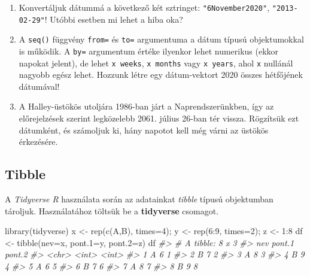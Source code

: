 \documentclass[
]{book}
\makeatletter
\newenvironment{Shaded}{\begin{snugshade}}{\end{snugshade}}
\newcommand{\AttributeTok}[1]{\textcolor[rgb]{0.77,0.63,0.00}{#1}}
\newcommand{\CommentTok}[1]{\textcolor[rgb]{0.56,0.35,0.01}{\textit{#1}}}
\newcommand{\DecValTok}[1]{\textcolor[rgb]{0.00,0.00,0.81}{#1}}
\newcommand{\FunctionTok}[1]{\textcolor[rgb]{0.00,0.00,0.00}{#1}}
\newcommand{\NormalTok}[1]{#1}
\newcommand{\OtherTok}[1]{\textcolor[rgb]{0.56,0.35,0.01}{#1}}
\newcommand{\SpecialCharTok}[1]{\textcolor[rgb]{0.00,0.00,0.00}{#1}}
\newcommand{\StringTok}[1]{\textcolor[rgb]{0.31,0.60,0.02}{#1}}
\providecommand{\tightlist}{%
  \setlength{\itemsep}{0pt}\setlength{\parskip}{0pt}}
\newenvironment{kframe}{%
\medskip{}
\setlength{\fboxsep}{.8em}
 \def\at@end@of@kframe{}%
 \ifinner\ifhmode%
  \def\at@end@of@kframe{\end{minipage}}%
  \begin{minipage}{\columnwidth}%
 \fi\fi%
 \def\FrameCommand##1{\hskip\@totalleftmargin \hskip-\fboxsep
 \colorbox{shadecolor}{##1}\hskip-\fboxsep
     \hskip-\linewidth \hskip-\@totalleftmargin \hskip\columnwidth}%
 \MakeFramed {\advance\hsize-\width
   \@totalleftmargin\z@ \linewidth\hsize
   \@setminipage}}%
 {\par\unskip\endMakeFramed%
 \at@end@of@kframe}
\newenvironment{rmdblock}[1]
  {
  \begin{itemize}
  \renewcommand{\labelitemi}{
    \raisebox{-.7\height}[0pt][0pt]{
      {\setkeys{Gin}{width=3em,keepaspectratio}\texttt{[image: images/\#1]}}
    }
  }
  \setlength{\fboxsep}{1em}
  \begin{kframe}
  \item
  }
  {
  \end{kframe}
  \end{itemize}
  }
\newenvironment{rmdexercise}
  {\begin{rmdblock}{exercise}}
  {\end{rmdblock}}
\makeatother
\begin{document}
\begin{rmdexercise}
\begin{enumerate}
\def\labelenumi{\arabic{enumi}.}
\tightlist
\item
  Konvertáljuk dátummá a következő két sztringet: \texttt{"6November2020"}, \texttt{"2013-02-29"}! Utóbbi esetben mi lehet a hiba oka?
\item
  A \texttt{seq()} függvény \texttt{from=} és \texttt{to=} argumentuma a dátum típusú objektumokkal is működik. A \texttt{by=} argumentum értéke ilyenkor lehet numerikus (ekkor napokat jelent), de lehet \texttt{x\ weeks}, \texttt{x\ months} vagy \texttt{x\ years}, ahol \texttt{x} nullánál nagyobb egész lehet. Hozzunk létre egy dátum-vektort 2020 összes hétfőjének dátumával!
\item
  A Halley-üstökös utoljára 1986-ban járt a Naprendszerünkben, így az előrejelzések szerint legközelebb 2061. július 26-ban tér vissza. Rögzítsük ezt dátumként, és számoljuk ki, hány napotot kell még várni az üstökös érkezésére.
\end{enumerate}
\end{rmdexercise}

\hypertarget{tibble}{%
\subsection{Tibble}\label{tibble}}

A \emph{Tidyverse R} használata során az adatainkat \emph{tibble} típusú objektumban tároljuk. Használatához töltsük be a \textbf{tidyverse} csomagot.

\begin{Shaded}
\begin{Highlighting}[]
\FunctionTok{library}\NormalTok{(tidyverse)}
\NormalTok{x }\OtherTok{\textless{}{-}} \FunctionTok{rep}\NormalTok{(}\FunctionTok{c}\NormalTok{(}\StringTok{\textquotesingle{}A\textquotesingle{}}\NormalTok{,}\StringTok{\textquotesingle{}B\textquotesingle{}}\NormalTok{), }\AttributeTok{times=}\DecValTok{4}\NormalTok{); y }\OtherTok{\textless{}{-}} \FunctionTok{rep}\NormalTok{(}\DecValTok{6}\SpecialCharTok{:}\DecValTok{9}\NormalTok{, }\AttributeTok{times=}\DecValTok{2}\NormalTok{); z }\OtherTok{\textless{}{-}} \DecValTok{1}\SpecialCharTok{:}\DecValTok{8}
\NormalTok{df }\OtherTok{\textless{}{-}} \FunctionTok{tibble}\NormalTok{(}\AttributeTok{nev=}\NormalTok{x, }\AttributeTok{pont.1=}\NormalTok{y, }\AttributeTok{pont.2=}\NormalTok{z)}
\NormalTok{df}
\CommentTok{\#\textgreater{} \# A tibble: 8 x 3}
\CommentTok{\#\textgreater{}   nev   pont.1 pont.2}
\CommentTok{\#\textgreater{}   \textless{}chr\textgreater{}  \textless{}int\textgreater{}  \textless{}int\textgreater{}}
\CommentTok{\#\textgreater{} 1 A          6      1}
\CommentTok{\#\textgreater{} 2 B          7      2}
\CommentTok{\#\textgreater{} 3 A          8      3}
\CommentTok{\#\textgreater{} 4 B          9      4}
\CommentTok{\#\textgreater{} 5 A          6      5}
\CommentTok{\#\textgreater{} 6 B          7      6}
\CommentTok{\#\textgreater{} 7 A          8      7}
\CommentTok{\#\textgreater{} 8 B          9      8}
\end{Highlighting}
\end{Shaded}
\end{document}
